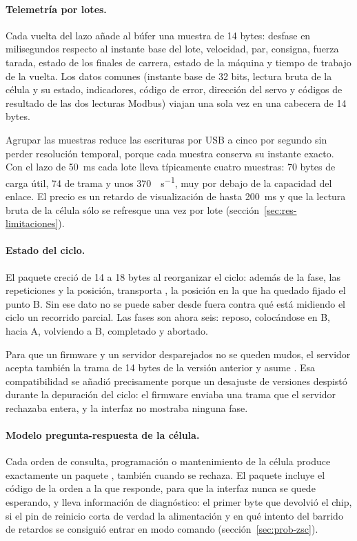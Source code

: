 \paragraph{Telemetría por lotes.} Cada vuelta del lazo añade al búfer una muestra de 14 bytes:
desfase en milisegundos respecto al instante base del lote, velocidad, par, consigna, fuerza tarada,
estado de los finales de carrera, estado de la máquina y tiempo de trabajo de la vuelta. Los datos
comunes (instante base de 32 bits, lectura bruta de la célula y su estado, indicadores, código de
error, dirección del servo y códigos de resultado de las dos lecturas Modbus) viajan una sola vez en
una cabecera de 14 bytes.

Agrupar las muestras reduce las escrituras por USB a cinco por segundo sin perder resolución
temporal, porque cada muestra conserva su instante exacto. Con el lazo de \SI{50}{\milli\second} cada
lote lleva típicamente cuatro muestras: 70 bytes de carga útil, 74 de trama y unos
\SI{370}{\byte\per\second}, muy por debajo de la capacidad del enlace. El precio es un retardo de
visualización de hasta \SI{200}{\milli\second} y que la lectura bruta de la célula sólo se refresque
una vez por lote (sección~\ref{sec:res-limitaciones}).

\paragraph{Estado del ciclo.} El paquete  creció de 14 a 18 bytes al reorganizar el
ciclo: además de la fase, las repeticiones y la posición, transporta , la posición
en la que ha quedado fijado el punto B. Sin ese dato no se puede saber desde fuera contra qué está
midiendo el ciclo un recorrido parcial. Las fases son ahora seis: reposo, colocándose en B, hacia A,
volviendo a B, completado y abortado.

Para que un firmware y un servidor desparejados no se queden mudos, el servidor acepta también la
trama de 14 bytes de la versión anterior y asume . Esa compatibilidad se añadió
precisamente porque un desajuste de versiones despistó durante la depuración del ciclo: el firmware
enviaba una trama que el servidor rechazaba entera, y la interfaz no mostraba ninguna fase.

\paragraph{Modelo pregunta-respuesta de la célula.} Cada orden de consulta, programación o
mantenimiento de la célula produce exactamente un paquete , también cuando se rechaza.
El paquete incluye el código de la orden a la que responde, para que la interfaz nunca se quede
esperando, y lleva información de diagnóstico: el primer byte que devolvió el chip, si el pin de
reinicio corta de verdad la alimentación y en qué intento del barrido de retardos se consiguió
entrar en modo comando (sección~\ref{sec:prob-zsc}).

